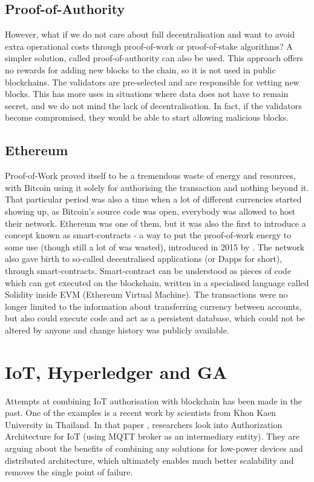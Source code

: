 \subsection{Proof-of-Authority}
However, what if we do not care about full decentralisation and want to avoid extra operational costs through proof-of-work or proof-of-stake algorithms? A simpler solution, called proof-of-authority \cite{network2017proof} can also be used. This approach offers no rewards for adding new blocks to the chain, so it is not used in public blockchains. The validators are pre-selected and are responsible for vetting new blocks. This has more uses in situations where data does not have to remain secret, and we do not mind the lack of decentralisation. In fact, if the validators become compromised, they would be able to start allowing malicious blocks.
\subsection{Ethereum}
Proof-of-Work proved itself to be a tremendous waste of energy and resources, with Bitcoin using it solely for authorising the transaction and nothing beyond it. That particular period was also a time when a lot of different currencies started showing up, as Bitcoin's source code was open, everybody was allowed to host their network. Ethereum was one of them, but it was also the first to introduce a concept known as smart-contracts - a way to put the proof-of-work energy to some use (though still a lot of was wasted), introduced in 2015 by \citet{buterin2014ethereum}. The network also gave birth to so-called decentralised applications (or Dapps for short), through smart-contracts. Smart-contract can be understood as pieces of code which can get executed on the blockchain, written in a specialised language called Solidity inside EVM (Ethereum Virtual Machine). The transactions were no longer limited to the information about transferring currency between accounts, but also could execute code and act as a persistent database, which could not be altered by anyone and change history was publicly available.


\section{IoT, Hyperledger and GA}

Attempts at combining IoT authorisation with blockchain has been made in the past. One of the examples is a recent work by scientists from Khon Kaen University in Thailand. In that paper \cite{klaokliang2018novel}, researchers look into Authorization Architecture for IoT (using MQTT broker as an intermediary entity). They are arguing about the benefits of combining any solutions for low-power devices and distributed architecture, which ultimately enables much better scalability and removes the single point of failure.

